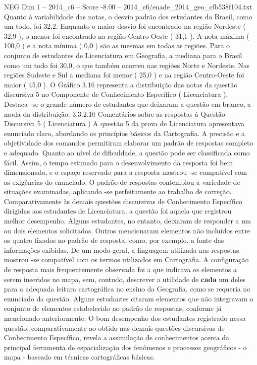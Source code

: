 \begin{textsample}{NEG Dim 1 – 2014\_c6 – Score -8.00 – 2014\_c6/enade\_2014\_geo\_cfb538f104.txt}
Quanto à variabilidade das notas, o desvio padrão dos estudantes do Brasil, como um todo, foi 32,2.
Enquanto o maior desvio foi encontrado na região Nordeste ( 32,9 ), o menor foi encontrado na região Centro-Oeste ( 31,1 ).
A nota máxima ( 100,0 ) e a nota mínima ( 0,0 ) são as mesmas em todas as regiões.
Para o conjunto de estudantes de Licenciatura em Geografia, a mediana para o Brasil como um todo foi 30,0, o que também ocorreu nas regiões Norte e Nordeste.
Nas regiões Sudeste e Sul a mediana foi menor ( 25,0 ) e na região Centro-Oeste foi maior ( 45,0 ).
O Gráfico 3.16 representa a distribuição das notas da questão discursiva 5 no Componente de Conhecimento Específico ( Licenciatura ).
Destaca -se o grande número de estudantes que deixaram a questão em branco, a moda da distribuição. 3.3.2.10 Comentários sobre as respostas à Questão Discursiva 5 ( Licenciatura ) A questão 5 da prova de Licenciatura apresentava enunciado claro, abordando os princípios básicos da Cartografia.
A precisão e a objetividade dos comandos permitiram elaborar um padrão de respostas completo e adequado.
Quanto ao nível de dificuldade, a questão pode ser classificada como fácil.
Assim, o tempo estimado para o desenvolvimento da resposta foi bem dimensionado, e o espaço reservado para a resposta mostrou -se compatível com as exigências do enunciado.
O padrão de respostas contemplou a variedade de situações examinadas, aplicando -se perfeitamente ao trabalho de correção.
Comparativamente às demais questões discursivas de Conhecimento Específico dirigidas aos estudantes de Licenciatura, a questão foi aquela que registrou melhor desempenho.
Alguns estudantes, no entanto, deixaram de responder a um ou dois elementos solicitados.
Outros mencionaram elementos não incluídos entre os quatro fixados no padrão de resposta, como, por exemplo, a fonte das informações exibidas.
De um modo geral, a linguagem utilizada nas respostas mostrou -se compatível com os termos utilizados em Cartografia.
A configuração de resposta mais frequentemente observada foi a que indicava os elementos a serem inseridos no mapa, sem, contudo, descrever a utilidade de \textbf{cada} um deles para a adequada leitura cartográfica no ensino da Geografia, como se requeria no enunciado da questão.
Alguns estudantes citaram elementos que não integravam o conjunto de elementos estabelecido no padrão de respostas, conforme já mencionado anteriormente.
O bom desempenho dos estudantes registrado nessa questão, comparativamente ao obtido nas demais questões discursivas de Conhecimento Específico, revela a assimilação de conhecimentos acerca da principal ferramenta de espacialização dos fenômenos e processos geográficos - o mapa - baseado em técnicas cartográficas básicas.

\end{textsample}
